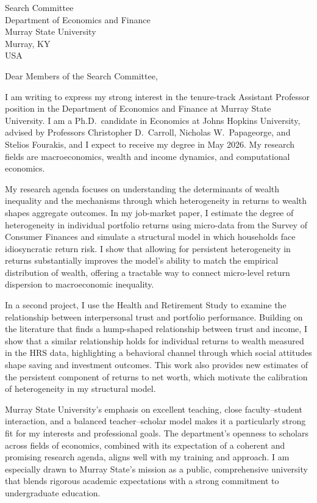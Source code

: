 \documentclass[11pt,letterpaper]{letter}
\begin{document}
\begin{letter}{Search Committee \\
Department of Economics and Finance \\
Murray State University \\
Murray, KY \\ USA}

\opening{Dear Members of the Search Committee,}

I am writing to express my strong interest in the tenure-track Assistant Professor position in the Department of Economics and Finance at Murray State University. I am a Ph.D.\ candidate in Economics at Johns Hopkins University, advised by Professors Christopher D.~Carroll, Nicholas W.~Papageorge, and Stelios Fourakis, and I expect to receive my degree in May 2026. My research fields are macroeconomics, wealth and income dynamics, and computational economics.

My research agenda focuses on understanding the determinants of wealth inequality and the mechanisms through which heterogeneity in returns to wealth shapes aggregate outcomes. In my job-market paper, I estimate the degree of heterogeneity in individual portfolio returns using micro-data from the Survey of Consumer Finances and simulate a structural model in which households face idiosyncratic return risk. I show that allowing for persistent heterogeneity in returns substantially improves the model’s ability to match the empirical distribution of wealth, offering a tractable way to connect micro-level return dispersion to macroeconomic inequality.

In a second project, I use the Health and Retirement Study to examine the relationship between interpersonal trust and portfolio performance. Building on the literature that finds a hump-shaped relationship between trust and income, I show that a similar relationship holds for individual returns to wealth measured in the HRS data, highlighting a behavioral channel through which social attitudes shape saving and investment outcomes. This work also provides new estimates of the persistent component of returns to net worth, which motivate the calibration of heterogeneity in my structural model.

Murray State University’s emphasis on excellent teaching, close faculty–student interaction, and a balanced teacher–scholar model makes it a particularly strong fit for my interests and professional goals. The department’s openness to scholars across fields of economics, combined with its expectation of a coherent and promising research agenda, aligns well with my training and approach. I am especially drawn to Murray State’s mission as a public, comprehensive university that blends rigorous academic expectations with a strong commitment to undergraduate education.


\end{letter}
\end{document}

